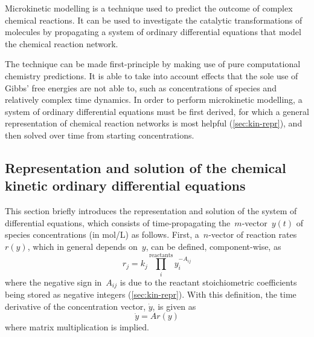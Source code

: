 Microkinetic modelling is a technique used to predict the outcome of complex
chemical reactions.
It can be used to investigate the catalytic transformations of molecules by
propagating a system of ordinary differential equations that model the chemical
reaction network.

The technique can be made first-principle by making use of pure computational
chemistry predictions.
It is able to take into account effects that the sole use of Gibbs' free energies
are not able to,
such as concentrations of species and relatively complex time dynamics.
In order to perform microkinetic modelling,
a system of ordinary differential equations must be first derived,
for which a general representation of chemical reaction networks is most helpful (\cref{sec:kin-repr}),
and then solved over time from starting concentrations.

\subsection{Representation and solution of the chemical kinetic ordinary differential equations}

This section briefly introduces the representation and solution of the system of differential equations,
which consists of
time-propagating the~$m$-vector~$y(t)$ of species concentrations (in mol/L) as follows.
First,
a~$n$-vector of reaction rates~$r(y)$,
which in general depends on~$y$,
can be defined,
component-wise,
as
% 
\begin{equation}
	r_j
	= k_j \prod_i^\text{reactants}
	y_i^{-A_{ij}}
\end{equation}
% 
where the negative sign in~$A_{ij}$ is due to the reactant stoichiometric coefficients being stored as negative integers (\cref{sec:kin-repr}).
With this definition,
the time derivative of the concentration vector,
$\dot{y}$,
is given as
% 
\begin{equation}\label{eq:master-equation}
	\dot{y} = A r(y)
\end{equation}
% 
where matrix multiplication is implied.

